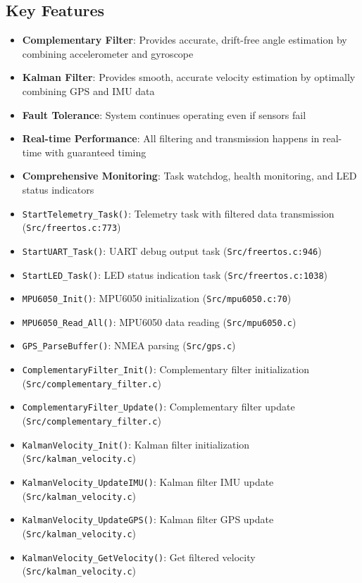 \documentclass[11pt,a4paper]{article}
\begin{document}
\subsection{Key Features}
\begin{itemize}
    \item \textbf{Complementary Filter}: Provides accurate, drift-free angle estimation by combining accelerometer and gyroscope
    \item \textbf{Kalman Filter}: Provides smooth, accurate velocity estimation by optimally combining GPS and IMU data
    \item \textbf{Fault Tolerance}: System continues operating even if sensors fail
    \item \textbf{Real-time Performance}: All filtering and transmission happens in real-time with guaranteed timing
    \item \textbf{Comprehensive Monitoring}: Task watchdog, health monitoring, and LED status indicators
    \item \texttt{StartTelemetry\_Task()}: Telemetry task with filtered data transmission (\texttt{Src/freertos.c:773})
    \item \texttt{StartUART\_Task()}: UART debug output task (\texttt{Src/freertos.c:946})
    \item \texttt{StartLED\_Task()}: LED status indication task (\texttt{Src/freertos.c:1038})
    \item \texttt{MPU6050\_Init()}: MPU6050 initialization (\texttt{Src/mpu6050.c:70})
    \item \texttt{MPU6050\_Read\_All()}: MPU6050 data reading (\texttt{Src/mpu6050.c})
    \item \texttt{GPS\_ParseBuffer()}: NMEA parsing (\texttt{Src/gps.c})
    \item \texttt{ComplementaryFilter\_Init()}: Complementary filter initialization (\texttt{Src/complementary\_filter.c})
    \item \texttt{ComplementaryFilter\_Update()}: Complementary filter update (\texttt{Src/complementary\_filter.c})
    \item \texttt{KalmanVelocity\_Init()}: Kalman filter initialization (\texttt{Src/kalman\_velocity.c})
    \item \texttt{KalmanVelocity\_UpdateIMU()}: Kalman filter IMU update (\texttt{Src/kalman\_velocity.c})
    \item \texttt{KalmanVelocity\_UpdateGPS()}: Kalman filter GPS update (\texttt{Src/kalman\_velocity.c})
    \item \texttt{KalmanVelocity\_GetVelocity()}: Get filtered velocity (\texttt{Src/kalman\_velocity.c})

\end{itemize}
\end{document}
